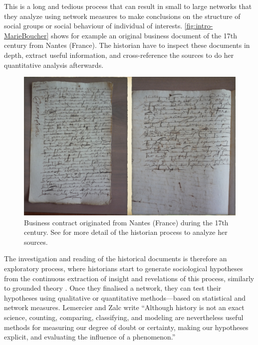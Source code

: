 This is a long and tedious process that can result in small to large networks that they analyze using network measures to make conclusions on the structure of social groups or social behaviour of individual of interests.
\autoref{fig:intro-MarieBoucher} shows for example an original business document of the 17th century from Nantes (France).
The historian have to inspect these documents in depth, extract useful information, and cross-reference the sources to do her quantitative analysis afterwards.
\begin{figure}[!ht]
    \centering %
    \includegraphics[width=1\textwidth]{src/static/figures/MarieBoucher-70.jpg}
    \caption{Business contract originated from Nantes (France) during the 17th century. See \cite{dufournaudCommentRendreVisible2018} for more detail of the historian process to analyze her sources.}
    \label{fig:intro-MarieBoucher}
\end{figure}
The investigation and reading of the historical documents is therefore an exploratory process, where historians start to generate sociological hypotheses from the continuous extraction of insight and revelations of this process, similarly to grounded theory \cite{glaserDiscoveryGroundedTheory2010}.
Once they finalised a network, they can test their hypotheses using qualitative or quantitative methods---based on statistical and network measures.
Lemercier and Zalc write ``Although history is not an exact science, counting, comparing, classifying, and modeling are nevertheless useful methods for measuring our degree of doubt or certainty, making our hypotheses explicit, and evaluating the influence of a phenomenon.''\cite{lemercierQuantitativeMethodsHumanities2019}
